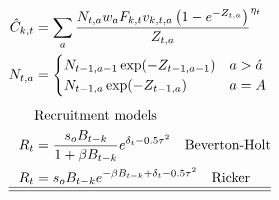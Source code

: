 \begin{table}[!tpb]
\begin{align}
        \hat{C}_{k,t}&=\sum _ a\frac {N_{{t,a}}w_{{a}}F_{k,t} v_{{k,t,a}}
        \left( 1-{e^{-Z_{t,a}}} \right) }{Z_{t,a}}^{\eta_t} \label{T4.10}\\
        N_{t,a}&=\begin{cases}
            N_{t-1,a-1} \exp(-Z_{t-1,a-1}) &a>\acute{a}\\
            N_{t-1,a} \exp(-Z_{t-1,a}) & a=A
        \end{cases}\label{T4.11}\\[1ex]
        &\mbox{Recruitment models} \nonumber\\
        R_t &= \frac{s_oB_{t-k}}{1+\beta B_{t-k}}e^{\delta_{t}-0.5\tau^2} 
        	\quad \mbox{Beverton-Holt} \label{T4.12}\\
        R_t &= s_oB_{t-k}e^{-\beta B_{t-k}+\delta_t-0.5\tau^2} 
        	\quad \mbox{Ricker} \label{T4.13}\\
        \hline \hline \nonumber
    \end{align}

    \normalEq
\end{table}

